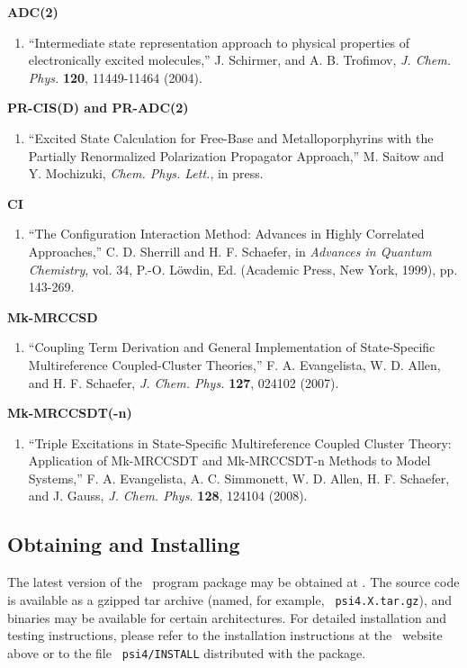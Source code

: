 {\bf ADC(2)} 
\begin{enumerate}
\item ``Intermediate state representation approach to physical properties of electronically excited molecules,''
  J. Schirmer, and A. B. Trofimov, {\em J. Chem. Phys.} {\bf 120},
  11449-11464 (2004).
\end{enumerate}

{\bf PR-CIS(D) and PR-ADC(2)} 
\begin{enumerate}
\item ``Excited State Calculation for Free-Base and Metalloporphyrins with
  the Partially Renormalized Polarization Propagator Approach,''
  M. Saitow and Y. Mochizuki, {\em Chem. Phys. Lett.}, in press.
\end{enumerate}

{\bf CI} 
\begin{enumerate}
\item ``The Configuration Interaction Method: Advances in Highly 
   Correlated Approaches,'' C. D. Sherrill and H. F. Schaefer, in
   {\em Advances in Quantum Chemistry}, vol. 34, P.-O. L{\"o}wdin, Ed.
   (Academic Press, New York, 1999), pp. 143-269.
\end{enumerate}

{\bf Mk-MRCCSD} 
\begin{enumerate}
\item ``Coupling Term Derivation and General Implementation of
  State-Specific Multireference Coupled-Cluster Theories,''
  F. A. Evangelista, W. D. Allen, and H. F. Schaefer, 
  {\em J. Chem. Phys.} {\bf 127}, 024102 (2007).
\end{enumerate}

{\bf Mk-MRCCSDT(-n)} 
\begin{enumerate}
\item ``Triple Excitations in State-Specific Multireference Coupled
  Cluster Theory: Application of Mk-MRCCSDT and Mk-MRCCSDT-n Methods to
  Model Systems,'' F. A. Evangelista, A. C. Simmonett, W. D. Allen,
  H. F. Schaefer, and J. Gauss, {\em J. Chem. Phys.} {\bf 128}, 124104
  (2008).
\end{enumerate}

\subsection{Obtaining and Installing \PSIfour}
\label{sec:installation}

The latest version of the \PSIfour\ program package may be obtained at
.  The
source code is available as a gzipped tar archive (named, for example, {\tt
psi4.X.tar.gz}), and binaries may be available for certain architectures.
For detailed installation and testing instructions, please refer to the
installation instructions at the \PSIfour\ website above or to the file {\tt
psi4/INSTALL} distributed with the package.

